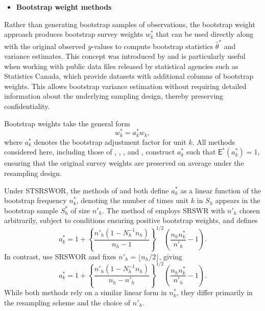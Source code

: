 \begin{itemize}
\tightlist
\item
  \textbf{Bootstrap weight methods}
\end{itemize}

\noindent Rather than generating bootstrap samples of observations, the bootstrap weight approach produces bootstrap survey weights \(w_k^*\) that can be used directly along with the original observed \(y\)-values to compute bootstrap statistics \(\hat\theta^*\) and variance estimates. This concept was introduced by \citet{Rao:Wu:Yue:1992} and is particularly useful when working with public data files released by statistical agencies such as Statistics Canada, which provide datasets with additional columns of bootstrap weights. This allows bootstrap variance estimation without requiring detailed information about the underlying sampling design, thereby preserving confidentiality.

Bootstrap weights take the general form
\[
    w_k^* = a_k^* w_k,
\]
where \(a_k^*\) denotes the bootstrap adjustment factor for unit \(k\). All methods considered here, including those of \citet{Rao:Wu:Yue:1992}, \citet{Chipperfield:Preston:2007}, \citet{Beaumont:Patak:2012}, and \citet{Bertail:Combris:1997}, construct \(a_k^*\) such that \(\mathsf{E}^*(a_k^*) = 1\), ensuring that the original survey weights are preserved on average under the resampling design.

Under STSRSWOR, the methods of \citet{Rao:Wu:Yue:1992} and \citet{Chipperfield:Preston:2007} both define \(a_k^*\) as a linear function of the bootstrap frequency \(n_k^*\), denoting the number of times unit \(k\) in \(\textrm{$S$}_h\) appears in the bootstrap sample \(\textrm{$S$}_h^*\) of size \(n'_h\). The method of \citet{Rao:Wu:Yue:1992} employs SRSWR with \(n'_h\) chosen arbitrarily, subject to conditions ensuring positive bootstrap weights, and defines
\[
    a_k^* = 1 + \left\{\frac{n'_h(1 - N_h^{-1} n_h)}{n_h - 1}\right\}^{1/2} \left(\frac{n_h n_k^*}{n'_h} - 1\right).
\]
In contrast, \citet{Chipperfield:Preston:2007} use SRSWOR and fixes \(n'_h = \lfloor n_h/2 \rfloor\), giving
\[
    a_k^* = 1 + \left\{\frac{n'_h(1 - N_h^{-1} n_h)}{n_h - n'_h} \right\}^{1/2} \left(\frac{n_h n_k^*}{n'_h} - 1\right).
\]
While both methods rely on a similar linear form in \(n_k^*\), they differ primarily in the resampling scheme and the choice of \(n'_h\).

